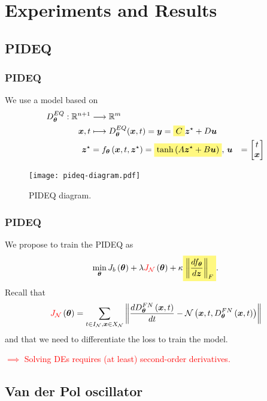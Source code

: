 \documentclass[t]{beamer}
\newcommand{\R}{\mathbb{R}}
\newcommand{\highlight}[1]{%
  \colorbox{yellow!50}{$\displaystyle#1$}}
\begin{document}
\section{Experiments and Results}

\subsection{PIDEQ}

\begin{frame}
    \frametitle{PIDEQ}
    We use a model based on \cite{Ghaoui2019}
    \begin{align*}
	D^{EQ}_{\bm{\theta}}: \R^{n+1} &\longrightarrow \R^{m} \\
	\bm{x},t &\longmapsto 	D^{EQ}_{\bm{\theta}}(\bm{x},t) = \bm{y} = \highlight{C} \bm{z}^{\star} + D\bm{u} \\
	\bm{z}^{\star} &= f_{\bm{\theta}}\left( \bm{x},t, \bm{z}^{\star} \right)= \highlight{\tanh \left( A\bm{z}^\star + B\bm{u} \right)},\, \bm{u} &= \begin{bmatrix} t \\ \bm{x} \end{bmatrix}
    \end{align*}
    \begin{figure}[h]
        \centering
        \texttt{[image: pideq-diagram.pdf]}
        \caption{PIDEQ diagram.}
        \label{fig:pideq-diagram}
    \end{figure}
\end{frame}

\begin{frame}
    \frametitle{PIDEQ}
    \vfill
    We propose to train the PIDEQ as \[
	\min_{\bm{\theta}} J_b\left( \bm{\theta} \right) + \lambda \textcolor{red}{J_{\mathcal{N}}}\left( \bm{\theta} \right) + \kappa \highlight{\left\lVert \frac{d f_{\bm{\theta}}}{d \bm{z}}\right\rVert_F}
    .\] \pause
    Recall that \[
	\textcolor{red}{J_{\mathcal{N}}}\left( \bm{\theta} \right) = \sum_{t \in I_{\mathcal{N}},\bm{x}\in X_{\mathcal{N}}} \left\| \frac{d D^{FN}_{\bm{\theta}}\left( \bm{x}, t \right) }{dt} - \mathcal{N}\left( \bm{x}, t,D^{FN}_{\bm{\theta}}\left( \bm{x}, t \right)  \right)  \right\|
    \] and that we need to differentiate the loss to train the model.
    \pause

    \textcolor{red}{$\implies$ Solving DEs requires (at least) second-order derivatives.}
\end{frame}

\subsection{Van der Pol oscillator}
\end{document}
